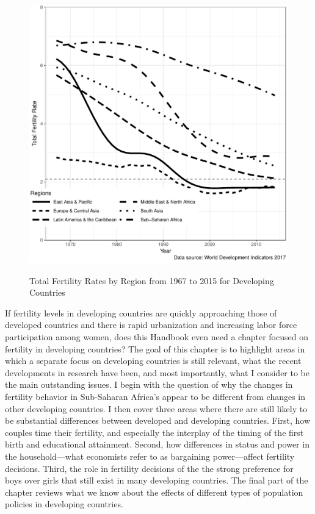 \documentclass[letterpaper,12pt]{article}
\begin{document}
\begin{figure}[hp]
    \centering
    \caption{Total Fertility Rates by Region from 1967 to 2015 for Developing Countries}
    \includegraphics[width=0.95\linewidth]{../figures/totalFertilityRatesBW.pdf}
    \label{fig:TFR}
\end{figure}

If fertility levels in developing countries are quickly approaching
those of developed countries and there is rapid urbanization and
increasing labor force participation among women, does this Handbook
even need a chapter focused on fertility in developing countries? 
The goal of this chapter is to highlight areas in which a separate focus on
developing countries is still relevant, what the recent developments in
research have been, and most importantly, what I consider to be the main
outstanding issues. 
I begin with the question of why the changes in fertility behavior in
Sub-Saharan Africa's appear to be different from changes in other
developing countries. 
I then cover three areas where there are still likely to be substantial
differences between developed and developing countries. 
First, how couples time their fertility, and especially the interplay of
the timing of the first birth and educational attainment. 
Second, how differences in status and power in the household---what
economists refer to as bargaining power---affect fertility decisions. 
Third, the role in fertility decisions of the the strong preference for
boys over girls that still exist in many developing countries. 
The final part of the chapter reviews what we know about the effects of
different types of population policies in developing countries.
\end{document}
